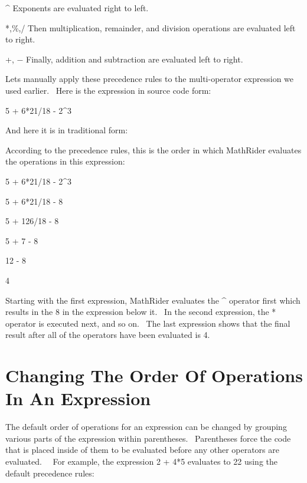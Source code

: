 \documentclass[12pt,twoside]{book}
\begin{document}
\bigskip

\^{} Exponents are evaluated right to left.


\bigskip

*,\%,/ Then multiplication, remainder, and division operations are
evaluated left to right.


\bigskip

+, $-$ Finally, addition and subtraction are evaluated left to right.


\bigskip

Lets manually apply these precedence rules to the multi{}-operator
expression we used earlier. \ Here is the expression in source code
form:


\bigskip

5 + 6*21/18 {}- 2\^{}3


\bigskip

And here it is in traditional form:


\bigskip


\bigskip

According to the precedence rules, this is the order in which MathRider
evaluates the operations in this expression:


\bigskip

5 + 6*21/18 {}- 2\^{}3

5 + 6*21/18 {}- 8

5 + 126/18 {}- 8

5 + 7 {}- 8

12 {}- 8

4


\bigskip

Starting with the first expression, MathRider evaluates the \^{}
operator first which results in the 8 in the expression below it. \ In
the second expression, the * operator is executed next, and so on.
\ The last expression shows that the final result after all of the
operators have been evaluated is 4.

\section[Changing The Order Of Operations In An
Expression]{Changing The Order Of Operations In An Expression}
The default order of operations for an expression can be changed by
grouping various parts of the expression within parentheses.
\ Parentheses force the code that is placed inside of them to be
evaluated before any other operators are evaluated. \ \ For example,
the expression 2 + 4*5 evaluates to 22 using the default precedence
rules:
\end{document}
